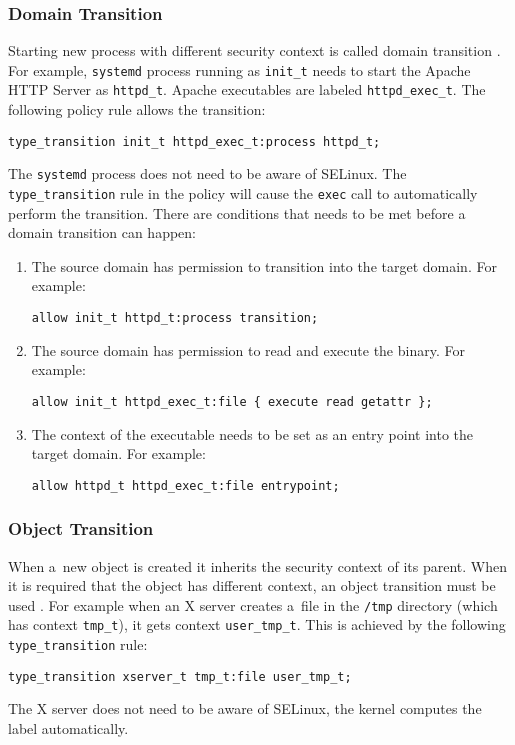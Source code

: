 \subsubsection{Domain Transition}
Starting new process with different security context is called domain transition
\cite[pp.~43--47]{tsn}. For example, \texttt{systemd} process running as
\texttt{init\_t} needs to start the Apache HTTP Server as \texttt{httpd\_t}.
Apache executables are labeled \texttt{httpd\_exec\_t}. The following policy
rule allows the transition:
\begin{lstlisting}[language=te]
type_transition init_t httpd_exec_t:process httpd_t;
\end{lstlisting}
The \texttt{systemd} process does not need to be aware of SELinux. The
\texttt{type\_transition} rule in the policy will cause the \texttt{exec} call
to automatically perform the transition. There are conditions that needs to be
met before a domain transition can happen:
\begin{enumerate}
    \item The source domain has permission to transition into the target domain.
        For example:
\begin{lstlisting}[language=te]
allow init_t httpd_t:process transition;
\end{lstlisting}
    \item The source domain has permission to read and execute the binary. For
        example:
\begin{lstlisting}[language=te]
allow init_t httpd_exec_t:file { execute read getattr };
\end{lstlisting}
    \item The context of the executable needs to be set as an entry point into
        the target domain. For example:
\begin{lstlisting}[language=te]
allow httpd_t httpd_exec_t:file entrypoint;
\end{lstlisting}
\end{enumerate}

\subsubsection{Object Transition}
When a~new object is created it inherits the security context of its parent.
When it is required that the object has different context, an object transition
must be used \cite[pp.~47--48]{tsn}. For example when an X server creates a~file
in the \texttt{/tmp} directory (which has context \texttt{tmp\_t}), it gets
context \texttt{user\_tmp\_t}. This is achieved by the following
\texttt{type\_transition} rule:
\begin{lstlisting}[language=te]
type_transition xserver_t tmp_t:file user_tmp_t;
\end{lstlisting}
The X server does not need to be aware of SELinux, the kernel computes the label
automatically.

